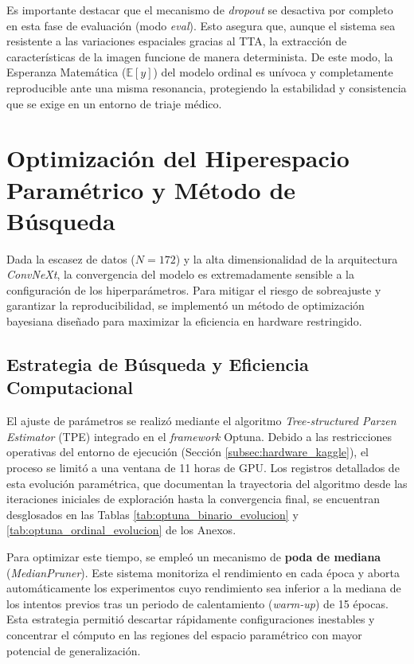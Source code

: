 \documentclass[12pt, oneside, english, spanish]{book}
\begin{document}
Es importante destacar que el mecanismo de \textit{dropout} se desactiva por completo en esta fase de evaluación (modo \textit{eval}). Esto asegura que, aunque el sistema sea resistente a las variaciones espaciales gracias al TTA, la extracción de características de la imagen funcione de manera determinista. De este modo, la Esperanza Matemática ($\mathbb{E}[y]$) del modelo ordinal es unívoca y completamente reproducible ante una misma resonancia, protegiendo la estabilidad y consistencia que se exige en un entorno de triaje médico.

\section{Optimización del Hiperespacio Paramétrico y Método de Búsqueda} \label{sec:optimizacion_hiperparametros}

Dada la escasez de datos ($N = 172$) y la alta dimensionalidad de la arquitectura \textit{ConvNeXt}, la convergencia del modelo es extremadamente sensible a la configuración de los hiperparámetros. Para mitigar el riesgo de sobreajuste y garantizar la reproducibilidad, se implementó un método de optimización bayesiana diseñado para maximizar la eficiencia en hardware restringido.

\subsection{Estrategia de Búsqueda y Eficiencia Computacional} \label{subsec:busqueda_eficiencia}

El ajuste de parámetros se realizó mediante el algoritmo \textit{Tree-structured Parzen Estimator} (TPE) integrado en el \textit{framework} Optuna. Debido a las restricciones operativas del entorno de ejecución (Sección \ref{subsec:hardware_kaggle}), el proceso se limitó a una ventana de 11 horas de GPU. Los registros detallados de esta evolución paramétrica, que documentan la trayectoria del algoritmo desde las iteraciones iniciales de exploración hasta la convergencia final, se encuentran desglosados en las Tablas \ref{tab:optuna_binario_evolucion} y \ref{tab:optuna_ordinal_evolucion} de los Anexos.

Para optimizar este tiempo, se empleó un mecanismo de \textbf{poda de mediana} (\textit{MedianPruner}). Este sistema monitoriza el rendimiento en cada época y aborta automáticamente los experimentos cuyo rendimiento sea inferior a la mediana de los intentos previos tras un periodo de calentamiento (\textit{warm-up}) de 15 épocas. Esta estrategia permitió descartar rápidamente configuraciones inestables y concentrar el cómputo en las regiones del espacio paramétrico con mayor potencial de generalización.
\end{document}
